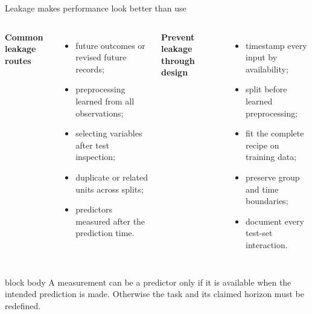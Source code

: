 \documentclass[10pt,aspectratio=169]{beamer}
\begin{document}
\begin{frame}{Leakage makes performance look better than use}

\small

\begin{columns}[T]


\textbf{Common leakage routes}

\begin{itemize}
  \item future outcomes or revised future records;
  \item preprocessing learned from all observations;
  \item selecting variables after test inspection;
  \item duplicate or related units across splits;
  \item predictors measured after the prediction time.
\end{itemize}


\textbf{Prevent leakage through design}

\begin{itemize}
  \item timestamp every input by availability;
  \item split before learned preprocessing;
  \item fit the complete recipe on training data;
  \item preserve group and time boundaries;
  \item document every test-set interaction.
\end{itemize}

\end{columns}

\vspace{0.35cm}

\begin{beamercolorbox}[rounded=true,sep=8pt]{block body}
A measurement can be a predictor only if it is available when the intended prediction is made. Otherwise the task and its claimed horizon must be redefined.
\end{beamercolorbox}

\end{frame}
\end{document}
